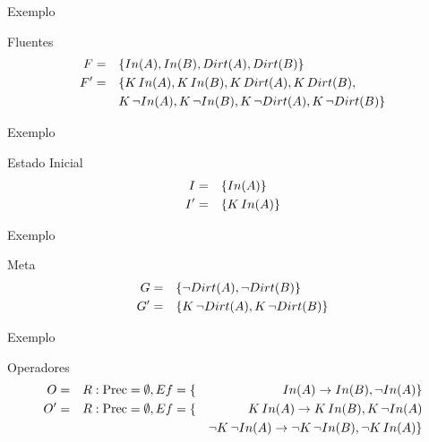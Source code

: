 \begin{frame}{Exemplo}
     \begin{block}{Fluentes}
        \begin{align*}
                F = \quad  & \{ In(A),In(B),Dirt(A),Dirt(B) \}\\
                F' = \quad  & \{ K\, In(A),K\, In(B),K\, Dirt(A),K\, Dirt(B),\\
                            & K\,\lnot In(A),K\,\lnot In(B),K\,\lnot Dirt(A),K\,\lnot Dirt(B) \}\\
        \end{align*}
    \end{block}    
\end{frame}
\begin{frame}{Exemplo}
     \begin{block}{Estado Inicial}
        \begin{align*}
                I = \quad  & \{ In(A)\} \\
                I' = \quad  & \{ K\, In(A) \} \\
        \end{align*}
    \end{block}    
\end{frame}
\begin{frame}{Exemplo}
     \begin{block}{Meta}
        \begin{align*}
                G = \quad  & \{ \lnot Dirt(A),\lnot Dirt(B)  \} \\
                G' = \quad  & \{ K\, \lnot Dirt(A),K\, \lnot Dirt(B)  \} \\
        \end{align*}
    \end{block}    
\end{frame}
\begin{frame}{Exemplo}
     \begin{block}{Operadores}
        \begin{align*}
                O  = \quad & R: \text{Prec} = \emptyset, Ef= \{& In(A) \rightarrow In(B),\lnot In(A) \} \\
                O' = \quad & R: \text{Prec} = \emptyset, Ef= \{& K\, In(A) \rightarrow K\, In(B), K\, \lnot In(A)  \\
                          &                                    &\lnot K\,\lnot In(A) \rightarrow \lnot K\,\lnot In(B), \lnot K\, In(A) \} \\
        \end{align*}
    \end{block}    
\end{frame}


